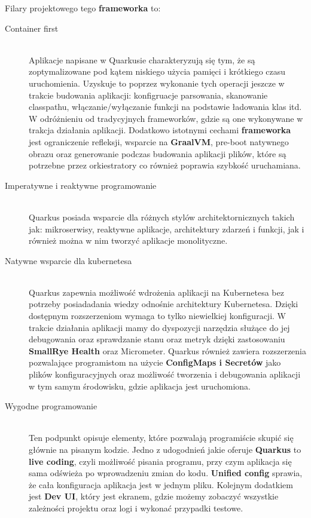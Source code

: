 \documentclass{iiuwb}
\begin{document}
Filary projektowego tego \textbf{frameworka} to:
\begin{description}
  \item[Container first] \hfill \\
  Aplikacje napisane w Quarkusie charakteryzują się tym, że są zoptymalizowane pod kątem niskiego użycia pamięci i krótkiego czasu uruchomienia. Uzyskuje to poprzez wykonanie tych operacji jeszcze w trakcie budowania aplikacji: konfigruacje parsowania, skanowanie classpathu, włączanie/wyłączanie funkcji na podstawie ładowania klas itd. W odróżnieniu od tradycyjnych frameworków, gdzie są one wykonywane w trakcja działania aplikacji. Dodatkowo istotnymi cechami \textbf{frameworka} jest ograniczenie refleksji, wsparcie na \textbf{GraalVM}, pre-boot natywnego obrazu oraz generowanie podczas budowania aplikacji plików, które są potrzebne przez orkiestratory co również poprawia szybkość uruchamiana.
  \item[Imperatywne i reaktywne programowanie] \hfill \\
  Quarkus posiada wsparcie dla różnych stylów architektornicznych takich jak: mikroserwisy, reaktywne aplikacje, architektury zdarzeń i funkcji, jak i również można w nim tworzyć aplikacje monolityczne.
  \item[Natywne wsparcie dla kubernetesa] \hfill \\
  Quarkus zapewnia możliwość wdrożenia aplikacji na Kubernetesa bez potrzeby posiadadania wiedzy odnośnie architektury Kubernetesa. Dzięki dostępnym rozszerzeniom wymaga to tylko niewielkiej konfiguracji. W trakcie działania aplikacji mamy do dyspozycji narzędzia służące do jej debugowania oraz sprawdzanie stanu oraz metryk dzięki zastosowaniu \textbf{SmallRye Health} oraz Micrometer. Quarkus również zawiera rozszerzenia pozwalające programistom na użycie \textbf{ConfigMaps i Secretów} jako plików konfiguracyjnych oraz możliwość tworzenia i debugowania aplikacji w tym samym środowisku, gdzie aplikacja jest uruchomiona. 
  \item[Wygodne programowanie] \hfill \\
  Ten podpunkt opisuje elementy, które pozwalają programiście skupić się głównie na pisanym kodzie. Jedno z udogodnień jakie oferuje \textbf{Quarkus} to \textbf{live coding}, czyli możliwość pisania programu, przy czym aplikacja się sama odświeża po wprowadzeniu zmian do kodu. \textbf{Unified config} sprawia, że cała konfiguracja aplikacja jest w jednym pliku. Kolejnym dodatkiem jest \textbf{Dev UI}, który jest ekranem, gdzie możemy zobaczyć wszystkie zależności projektu oraz logi i wykonać przypadki testowe. 
\end{description}
\end{document}
